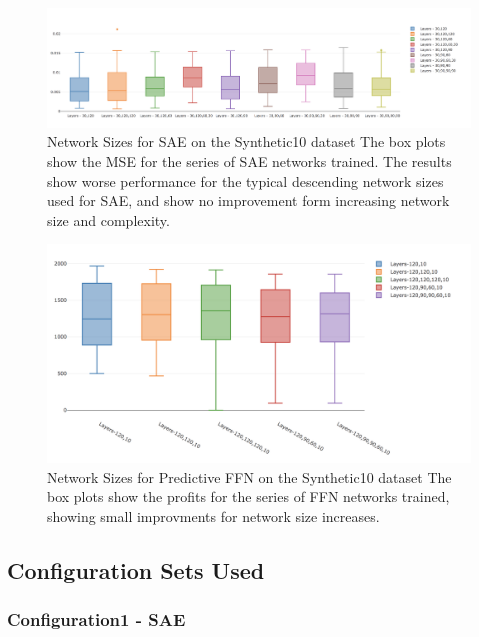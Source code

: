\documentclass[a4paper,latin]{paper}
\begin{document}
	\begin{figure}[H]
	\centering \includegraphics[scale=0.3]{images/iteration_four/it4_sae_layers.png}
	\caption{Network Sizes for SAE on the Synthetic10 dataset \newline The box plots show the MSE for the series of SAE networks trained. The results show worse performance for the typical descending network sizes used for SAE, and show no improvement form increasing network size and complexity.}
	\label{figure-appendix-it4_sae_layers}
	\end{figure}
	
	\begin{figure}[H]
		\centering \includegraphics[scale=0.3]{images/iteration_four/it4_ffn_network_size.png}
		\caption{Network Sizes for Predictive FFN on the Synthetic10 dataset \newline The box plots show the profits for the series of FFN networks trained, showing small improvments for network size increases.}
		\label{figure-appendix-it4_ffn_network_size}
	\end{figure}

\subsection{Configuration Sets Used}

\subsubsection{Configuration1 - SAE}\label{config1}
\end{document}
